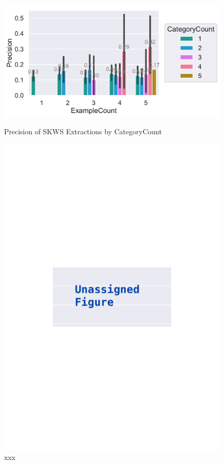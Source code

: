 \documentclass[\myrootdir/main.tex]{subfiles}
\begin{document}
\begin{figure}[htbp]
	\centering
	\begin{minipage}{0.45\textwidth}
		\centering
		\includegraphics[width=\textwidth, clip]{img/big-study/precision-categorycount-examplecount-kw.pdf}
		\caption{Precision of SKWS Extractions by CategoryCount}
		\label{fig:precision-categorycount-examplecount-kw}
	\end{minipage}\hfill
	\begin{minipage}{0.45\textwidth}
		\centering
		\includegraphics[width=\textwidth, clip]{img/big-study/xxx.pdf}
		\caption{xxx}
		\label{fig:xxx}
	\end{minipage}
\end{figure}
\end{document}

